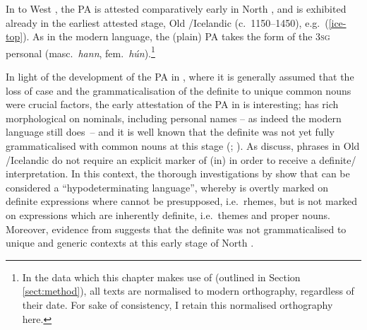 \documentclass[output=paper,colorlinks,citecolor=brown]{langscibook}
\begin{document}
\begin{sloppypar}
In  to West , the PA is attested comparatively early in North , and is exhibited already in the earliest attested stage, Old /Icelandic (c.~1150--1450), e.g.~(\ref{ice-top}). As in the modern language, the  (plain) PA takes the form of the 3\textsc{sg} personal  (masc.~\textit{hann}, fem.~\textit{hún}).\footnote{In the  data which this chapter makes use of (outlined in Section \ref{sect:method}), all texts are normalised to modern  orthography, regardless of their date. For sake of consistency, I retain this normalised orthography here.}
\end{sloppypar}


\z 

In light of the development of the PA in , where it is generally assumed that the loss of case and the grammaticalisation of the definite  to unique common nouns were crucial factors, the early attestation of the PA in  is interesting;  has rich morphological  on nominals, including personal names -- as indeed the modern language still does~-- and it is well known that the definite  was not yet fully grammaticalised with common nouns at this stage (\citealp{leiss2000artikel, leiss2007covert}; \citealp{Borjarsetal16}).
As \citet{Borjarsetal16} discuss,  phrases in Old /Icelandic do not require an explicit marker of (in) in order to receive a definite/ interpretation.  In this context, the thorough investigations by \citet{leiss2000artikel,leiss2007covert} show that  can be considered a ``hypodeterminating language'', whereby  is overtly marked on definite expressions where  cannot be presupposed, i.e.~rhemes, but is not marked on expressions which are inherently definite, i.e.~themes and proper nouns. 
Moreover, evidence from  suggests that the definite  was not grammaticalised to unique and generic contexts at this early stage of North  \citep{skrzypek2012grammaticalization}.\largerpage
\end{document}
